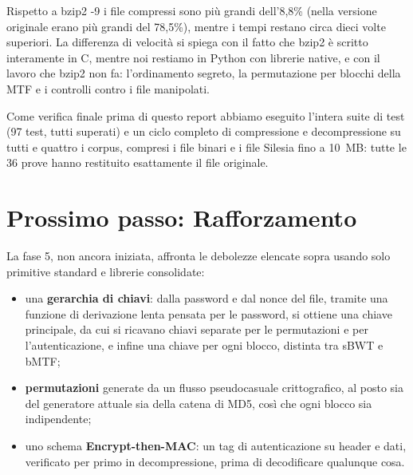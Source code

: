 \documentclass[11pt,a4paper]{article}
\begin{document}
Rispetto a bzip2 -9 i file compressi sono più grandi dell'8,8\% (nella versione originale
erano più grandi del 78,5\%), mentre i tempi restano circa dieci volte superiori. La
differenza di velocità si spiega con il fatto che bzip2 è scritto interamente in C, mentre
noi restiamo in Python con librerie native, e con il lavoro che bzip2 non fa: l'ordinamento
segreto, la permutazione per blocchi della MTF e i controlli contro i file manipolati.

Come verifica finale prima di questo report abbiamo eseguito l'intera suite di test (97
test, tutti superati) e un ciclo completo di compressione e decompressione su tutti e
quattro i corpus, compresi i file binari e i file Silesia fino a 10~MB: tutte le 36 prove
hanno restituito esattamente il file originale.

\section{Prossimo passo: Rafforzamento}

La fase 5, non ancora iniziata, affronta le debolezze elencate sopra usando solo primitive
standard e librerie consolidate:
\begin{itemize}
  \item una \textbf{gerarchia di chiavi}: dalla password e dal nonce del file, tramite una
        funzione di derivazione lenta pensata per le password, si ottiene una chiave
        principale, da cui si ricavano chiavi separate per le permutazioni e per
        l'autenticazione, e infine una chiave per ogni blocco, distinta tra sBWT e bMTF;
  \item \textbf{permutazioni} generate da un flusso pseudocasuale crittografico, al posto
        sia del generatore attuale sia della catena di MD5, così che ogni blocco sia
        indipendente;
  \item uno schema \textbf{Encrypt-then-MAC}: un tag di autenticazione su header e dati,
        verificato per primo in decompressione, prima di decodificare qualunque cosa.
\end{itemize}
\end{document}
